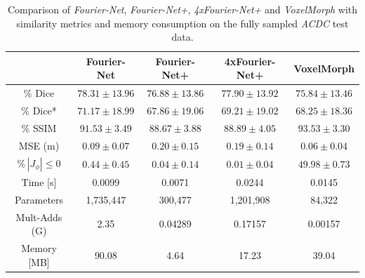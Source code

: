\documentclass[english,version-2022-01]{uzl-thesis} %
\begin{document}
\begin{table}[h] %
	\centering
	\caption{Comparison of \emph{Fourier-Net}, \emph{Fourier-Net+}, \emph{4xFourier-Net+} and \emph{VoxelMorph} with similarity metrics and memory consumption on the fully sampled \emph{ACDC} test data.}
	\label{tab:CompareVoxelMorph}
	\begin{tabular}{c c c c c} %
		\toprule
		 & Fourier-Net & Fourier-Net+ & 4xFourier-Net+ & VoxelMorph \\		
		\midrule
		$\%$ Dice & $78.31 \pm 13.96$ & $76.88 \pm 13.86$ & $77.90 \pm 13.92$ & $75.84 \pm 13.46$ \\
		$\%$ Dice* & $71.17 \pm 18.99$ & $67.86 \pm 19.06$ & $69.21 \pm 19.02$ & $68.25 \pm 18.36$ \\
		$\%$ SSIM & $91.53 \pm 3.49$ & $88.67 \pm 3.88$ & $88.89 \pm 4.05$ & $93.53 \pm 3.30$ \\
		MSE (m) & $0.09 \pm 0.07$ & $0.20 \pm 0.15$ & $0.19 \pm 0.14$ & $0.06 \pm 0.04$ \\
		$\% \, |J_{\phi}|\leq0$ & $0.44 \pm 0.45$ & $0.04 \pm 0.14$ & $0.01 \pm 0.04$ & $49.98 \pm 0.73$ \\
		Time [s] 	  & 0.0099    & 0.0071 	& 0.0244  	& 0.0145 \\
		Parameters 	  & 1,735,447 & 300,477 	& 1,201,908 	& 84,322 \\
		Mult-Adds (G) & 2.35      & 0.04289  & 0.17157  	& 0.00157 \\
		Memory [MB] 	  & 90.08     & 4.64   	& 17.23    	& 39.04 \\
		\bottomrule
	\end{tabular}		
\end{table}
\end{document}
